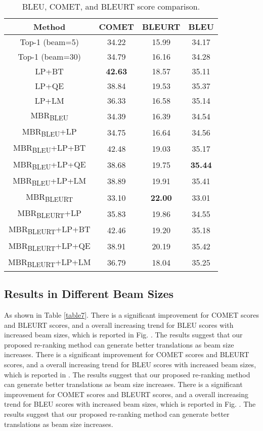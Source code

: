 \documentclass{article}
\begin{document}
\begin{table}[!htbp]
\centering
\begin{tabular}{cccc}
\toprule
Method          & COMET & BLEURT & BLEU  \\ \hline
Top-1 (beam=5)  & 34.22 & 15.99  & 34.17 \\
Top-1 (beam=30) & 34.79 & 16.16  & 34.28 \\
LP+BT           & \textbf{42.63} & 18.57  & 35.11 \\
LP+QE           & 38.84 & 19.53  & 35.37 \\
LP+LM           & 36.33 & 16.58  & 35.14 \\ \hline
MBR\textsubscript{BLEU}            & 34.39 & 16.39  & 34.54 \\
MBR\textsubscript{BLEU}+LP         & 34.75 & 16.64  & 34.56 \\
MBR\textsubscript{BLEU}+LP+BT      & 42.48 & 19.03  & 35.17 \\
MBR\textsubscript{BLEU}+LP+QE      & 38.68 & 19.75  & \textbf{35.44} \\
MBR\textsubscript{BLEU}+LP+LM      & 38.89 & 19.91  & 35.41 \\ \hline
MBR\textsubscript{BLEURT}          & 33.10 & \textbf{22.00}  & 33.01 \\
MBR\textsubscript{BLEURT}+LP       & 35.83 & 19.86  & 34.55 \\
MBR\textsubscript{BLEURT}+LP+BT    & 42.46 & 19.20  & 35.18 \\
MBR\textsubscript{BLEURT}+LP+QE    & 38.91 & 20.19  & 35.42 \\
MBR\textsubscript{BLEURT}+LP+LM    & 36.79 & 18.04  & 35.25 \\ \bottomrule
\end{tabular}
\caption{BLEU, COMET, and BLEURT score comparison.}
\label{table6}
\end{table}

\subsection{Results in Different Beam Sizes}
As shown in Table \ref{table7}.  There is a significant improvement for COMET scores and BLEURT scores, and a overall increasing trend for BLEU scores with increased beam sizes, which is reported in Fig. . The results suggest that our proposed re-ranking method can generate better translations as beam size increases.  There is a significant improvement for COMET scores and BLEURT scores, and a overall increasing trend for BLEU scores with increased beam sizes, which is reported in . The results suggest that our proposed re-ranking method can generate better translations as beam size increases. There is a significant improvement for COMET scores and BLEURT scores, and a overall increasing trend for BLEU scores with increased beam sizes, which is reported in Fig. . The results suggest that our proposed re-ranking method can generate better translations as beam size increases.
\end{document}
